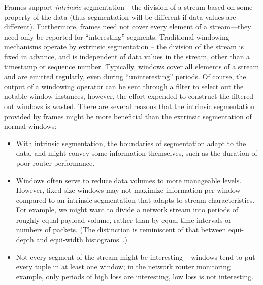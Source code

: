 \documentclass{vldb}
\newcommand{\dquote}[1]{``#1''}
\begin{document}
Frames support \emph{intrinsic} segmentation---the division of a stream based on some property of the data (thus segmentation will be different if data values are different). Furthermore, frames need not cover every element of a stream---they need only be reported for \dquote{interesting} segments. Traditional windowing mechanisms operate by extrinsic segmentation – the division of the stream is fixed in advance, and is independent of data values in the stream, other than a timestamp or sequence number. Typically, windows cover all elements of a stream and are emitted regularly, even during \dquote{uninteresting} periods. Of course, the output of a windowing operator can be sent through a filter to select out the notable window instances, however, the effort expended to construct the filtered-out windows is wasted. There are several reasons that the intrinsic segmentation provided by frames might be more beneficial than the extrinsic segmentation of normal windows:
%
\begin{itemize}
\item With intrinsic segmentation, the boundaries of segmentation adapt to the data, and might convey some information themselves, such as the duration of poor router performance.
\item Windows often serve to reduce data volumes to more manageable levels. However, fixed-size windows may not maximize information per window compared to an intrinsic segmentation that adapts to stream characteristics. For example, we might want to divide a network stream into periods of roughly equal payload volume, rather than by equal time intervals or numbers of packets. (The distinction is reminiscent of that between equi-depth and equi-width histograms~\cite{IP1995}.) 
\item Not every segment of the stream might be interesting – windows tend to put every tuple in at least one window; in the network router monitoring example, only periods of high loss are interesting, low loss is not interesting.
\end{itemize}
\end{document}

